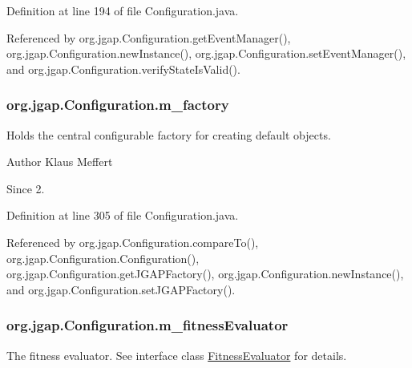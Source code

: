 Definition at line 194 of file Configuration.\-java.



Referenced by org.\-jgap.\-Configuration.\-get\-Event\-Manager(), org.\-jgap.\-Configuration.\-new\-Instance(), org.\-jgap.\-Configuration.\-set\-Event\-Manager(), and org.\-jgap.\-Configuration.\-verify\-State\-Is\-Valid().

\hypertarget{classorg_1_1jgap_1_1_configuration_ac5cefe752b75153b80e8bbc9eba9384d}{
\subsubsection[{m\-\_\-factory}]{ org.\-jgap.\-Configuration.\-m\-\_\-factory\hspace{0.3cm}{\ttfamily [private]}}}\label{classorg_1_1jgap_1_1_configuration_ac5cefe752b75153b80e8bbc9eba9384d}
Holds the central configurable factory for creating default objects.

\begin{DoxyAuthor}{Author}
Klaus Meffert 
\end{DoxyAuthor}
\begin{DoxySince}{Since}
2. 
\end{DoxySince}


Definition at line 305 of file Configuration.\-java.



Referenced by org.\-jgap.\-Configuration.\-compare\-To(), org.\-jgap.\-Configuration.\-Configuration(), org.\-jgap.\-Configuration.\-get\-J\-G\-A\-P\-Factory(), org.\-jgap.\-Configuration.\-new\-Instance(), and org.\-jgap.\-Configuration.\-set\-J\-G\-A\-P\-Factory().

\hypertarget{classorg_1_1jgap_1_1_configuration_a4e997fe7d3a1557a2480602cfb53841c}{
\subsubsection[{m\-\_\-fitness\-Evaluator}]{ org.\-jgap.\-Configuration.\-m\-\_\-fitness\-Evaluator\hspace{0.3cm}{\ttfamily [private]}}}\label{classorg_1_1jgap_1_1_configuration_a4e997fe7d3a1557a2480602cfb53841c}
The fitness evaluator. See interface class \hyperlink{interfaceorg_1_1jgap_1_1_fitness_evaluator}{Fitness\-Evaluator} for details.


